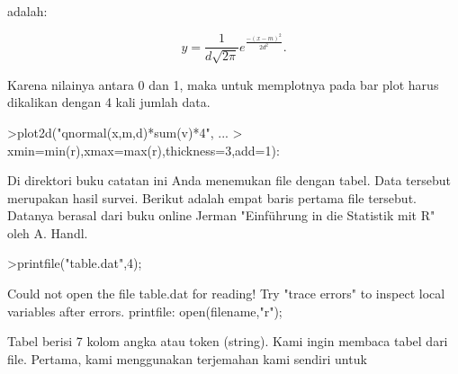 \documentclass[a4paper,10pt]{article}
\begin{document}
\begin{eulernotebook}
\begin{eulercomment}
\begin{eulercomment}
\begin{eulercomment}
\begin{eulercomment}
\begin{eulercomment}
\begin{eulercomment}
\begin{eulercomment}
\begin{eulercomment}
\begin{eulercomment}
\begin{eulercomment}
\begin{eulercomment}
\begin{eulercomment}
\begin{eulercomment}
\begin{eulercomment}
\begin{eulercomment}
\begin{eulercomment}
\begin{eulercomment}
\begin{eulercomment}
\begin{eulercomment}
\begin{eulercomment}
\begin{eulercomment}
\begin{eulercomment}
\begin{eulercomment}
\begin{eulercomment}
\begin{eulercomment}
\begin{eulercomment}
\begin{eulercomment}
\begin{eulercomment}
\begin{eulercomment}
\begin{eulercomment}
\begin{eulercomment}
\begin{eulercomment}
\begin{eulercomment}
\begin{eulercomment}
\begin{eulercomment}
\begin{eulercomment}
\begin{eulercomment}
\begin{eulercomment}
\begin{eulercomment}
\begin{eulercomment}
\begin{eulercomment}
\begin{eulercomment}
\begin{eulercomment}
\begin{eulercomment}
\begin{eulercomment}
\begin{eulercomment}
\begin{eulercomment}
\begin{eulercomment}
\begin{eulercomment}
\begin{eulercomment}
\begin{eulercomment}
\begin{eulercomment}
\begin{eulercomment}
\begin{eulercomment}
\begin{eulercomment}
\begin{eulercomment}
\begin{eulercomment}
\begin{eulercomment}
\begin{eulercomment}
\begin{eulercomment}
\begin{eulercomment}
\begin{eulercomment}
\begin{eulercomment}
\begin{eulercomment}
\begin{eulercomment}
\begin{eulercomment}
\begin{eulercomment}
adalah:

\end{eulercomment}
\begin{eulerformula}
\[
y=\frac{1}{d\sqrt{2\pi}}e^{\frac{-(x-m)^2}{2d^2}}.
\]
\end{eulerformula}
\begin{eulercomment}
Karena nilainya antara 0 dan 1, maka untuk memplotnya pada bar plot
harus dikalikan dengan 4 kali jumlah data.
\end{eulercomment}
\begin{eulerprompt}
>plot2d("qnormal(x,m,d)*sum(v)*4", ...
>  xmin=min(r),xmax=max(r),thickness=3,add=1):
\end{eulerprompt}
\begin{eulercomment}
Di direktori buku catatan ini Anda menemukan file dengan tabel. Data
tersebut merupakan hasil survei. Berikut adalah empat baris pertama
file tersebut. Datanya berasal dari buku online Jerman "Einführung in
die Statistik mit R" oleh A. Handl.
\end{eulercomment}
\begin{eulerprompt}
>printfile("table.dat",4);
\end{eulerprompt}
\begin{euleroutput}
  Could not open the file
  table.dat
  for reading!
  Try "trace errors" to inspect local variables after errors.
  printfile:
      open(filename,"r");
\end{euleroutput}
\begin{eulercomment}
Tabel berisi 7 kolom angka atau token (string). Kami ingin membaca
tabel dari file. Pertama, kami menggunakan terjemahan kami sendiri
untuk 
\end{eulercomment}
\end{eulercomment}
\end{eulercomment}
\end{eulercomment}
\end{eulercomment}
\end{eulercomment}
\end{eulercomment}
\end{eulercomment}
\end{eulercomment}
\end{eulercomment}
\end{eulercomment}
\end{eulercomment}
\end{eulercomment}
\end{eulercomment}
\end{eulercomment}
\end{eulercomment}
\end{eulercomment}
\end{eulercomment}
\end{eulercomment}
\end{eulercomment}
\end{eulercomment}
\end{eulercomment}
\end{eulercomment}
\end{eulercomment}
\end{eulercomment}
\end{eulercomment}
\end{eulercomment}
\end{eulercomment}
\end{eulercomment}
\end{eulercomment}
\end{eulercomment}
\end{eulercomment}
\end{eulercomment}
\end{eulercomment}
\end{eulercomment}
\end{eulercomment}
\end{eulercomment}
\end{eulercomment}
\end{eulercomment}
\end{eulercomment}
\end{eulercomment}
\end{eulercomment}
\end{eulercomment}
\end{eulercomment}
\end{eulercomment}
\end{eulercomment}
\end{eulercomment}
\end{eulercomment}
\end{eulercomment}
\end{eulercomment}
\end{eulercomment}
\end{eulercomment}
\end{eulercomment}
\end{eulercomment}
\end{eulercomment}
\end{eulercomment}
\end{eulercomment}
\end{eulercomment}
\end{eulercomment}
\end{eulercomment}
\end{eulercomment}
\end{eulercomment}
\end{eulercomment}
\end{eulercomment}
\end{eulercomment}
\end{eulercomment}
\end{eulercomment}
\end{eulernotebook}
\end{document}
